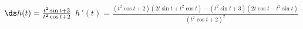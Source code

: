 {$\ds h(t) = \frac{t^2\sin t+3}{t^2\cos t+2}$
}
{$h\,'(t) = \frac{(t^2\cos t+2)(2t\sin t+t^2\cos t)-(t^2\sin t+3)(2t\cos t-t^2\sin t)}{(t^2\cos t+2)^2}$
}
